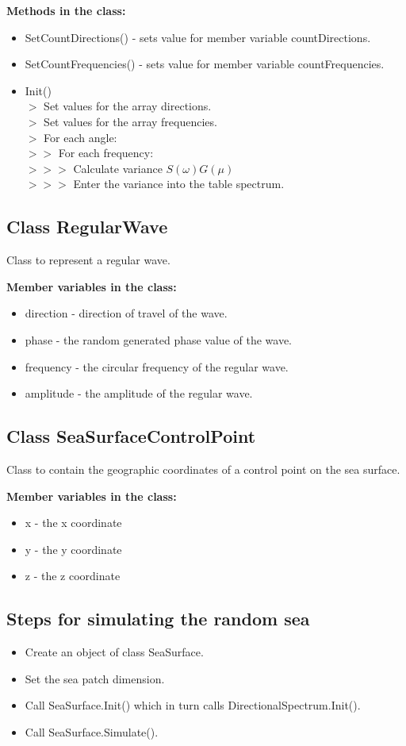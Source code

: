 \textbf{Methods in the class:}
\begin{itemize}
	\item SetCountDirections() - sets value for member variable countDirections.
	\item SetCountFrequencies() - sets value for member variable countFrequencies.
	\item Init()\\
    $>$ Set values for the array directions. \\
		$>$ Set values for the array frequencies. \\
		$>$ For each angle:\\
		$>>$ For each frequency:\\
		$>>>$ Calculate variance $S(\omega)G(\mu)$\\
    $>>>$ Enter the variance into the table spectrum. 
\end{itemize}

\subsection{Class RegularWave} \label{Class RegularWave}
Class to represent a regular wave.

\textbf{Member variables in the class:}
\begin{itemize}
	\item direction - direction of travel of the wave.
	\item phase - the random generated phase value of the wave.
	\item frequency - the circular frequency of the regular wave.
	\item amplitude - the amplitude of the regular wave.
\end{itemize}

\subsection{Class SeaSurfaceControlPoint} \label{Class SeaSurfaceControlPoint}
Class to contain the geographic coordinates of a control point on the sea 
surface. 

\textbf{Member variables in the class:} 
\begin{itemize} 
  \item x - the x coordinate 
  \item y - the y coordinate
  \item z - the z coordinate
\end{itemize}

\subsection{Steps for simulating the random sea} 
\label{Process for simulating the random sea}
\begin{itemize}
	\item Create an object of class SeaSurface.
	\item Set the sea patch dimension.
	\item Call SeaSurface.Init() which in turn calls DirectionalSpectrum.Init().
	\item Call SeaSurface.Simulate().
\end{itemize}
